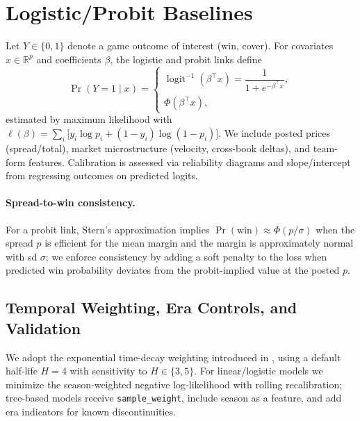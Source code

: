 \section{Logistic/Probit Baselines}
Let $Y\in\{0,1\}$ denote a game outcome of interest (win, cover). For covariates $x\in\mathbb{R}^p$ and coefficients $\beta$, the logistic and probit links define
\begin{equation*}
\Pr(Y=1\mid x)=\begin{cases}
 \operatorname{logit}^{-1}(\beta^\top x)=\dfrac{1}{1+e^{-\beta^\top x}},\\[3pt]
 \Phi(\beta^\top x),
\end{cases}
\end{equation*}
estimated by maximum likelihood with $\ell(\beta)=\sum_i \big[y_i\log p_i+(1-y_i)\log(1-p_i)\big]$. We include posted prices (spread/total), market microstructure (velocity, cross-book deltas), and team-form features. Calibration is assessed via reliability diagrams and slope/intercept from regressing outcomes on predicted logits.

\paragraph{Spread-to-win consistency.} For a probit link, Stern's approximation implies $\Pr(\text{win})\approx \Phi(p/\sigma)$ when the spread $p$ is efficient for the mean margin and the margin is approximately normal with sd $\sigma$; we enforce consistency by adding a soft penalty to the loss when predicted win probability deviates from the probit-implied value at the posted $p$.

\subsection{Temporal Weighting, Era Controls, and Validation}
We adopt the exponential time‑decay weighting introduced in , using a default half‑life $H=4$ with sensitivity to $H\in\{3,5\}$. For linear/logistic models we minimize the season‑weighted negative log‑likelihood with rolling recalibration; tree‑based models receive \texttt{sample\_weight}, include season as a feature, and add era indicators for known discontinuities.

